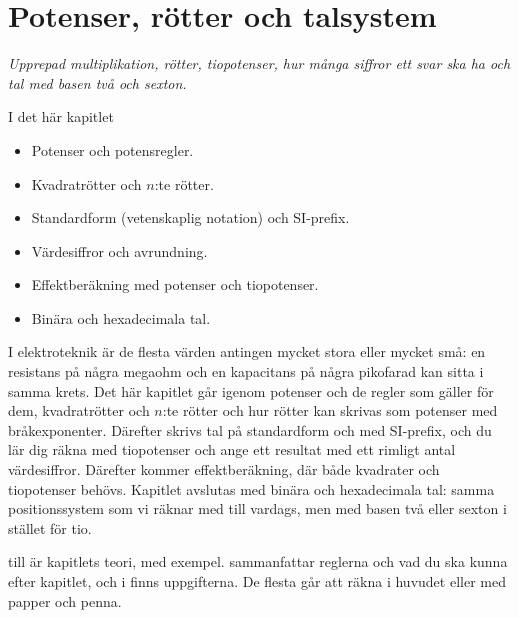 
\chapter{Potenser, rötter och talsystem}
\label{c5:ch}

{\large\itshape Upprepad multiplikation, rötter, tiopotenser, hur många siffror ett svar ska ha
och tal med basen två och sexton.\par}

\begin{chapterbox}{I det här kapitlet}
\begin{itemize}
  \item Potenser och potensregler.
  \item Kvadratrötter och $n$:te rötter.
  \item Standardform (vetenskaplig notation) och SI-prefix.
  \item Värdesiffror och avrundning.
  \item Effektberäkning med potenser och tiopotenser.
  \item Binära och hexadecimala tal.
\end{itemize}
\end{chapterbox}

I elektroteknik är de flesta värden antingen mycket stora eller mycket små: en resistans på några
megaohm och en kapacitans på några pikofarad kan sitta i samma krets. Det här kapitlet går igenom
potenser och de regler som gäller för dem, kvadratrötter och $n$:te rötter och hur rötter kan
skrivas som potenser med bråkexponenter. Därefter skrivs tal på standardform och med SI-prefix,
och du lär dig räkna med tiopotenser och ange ett resultat med ett rimligt antal värdesiffror.
Därefter kommer effektberäkning, där både kvadrater och tiopotenser behövs. Kapitlet avslutas med
binära och hexadecimala tal: samma positionssystem som vi räknar med till vardags, men med basen
två eller sexton i stället för tio.

 till  är kapitlets teori, med exempel.
 sammanfattar reglerna och vad du ska kunna efter kapitlet, och i
 finns uppgifterna. De flesta går att räkna i huvudet eller med papper och
penna.




